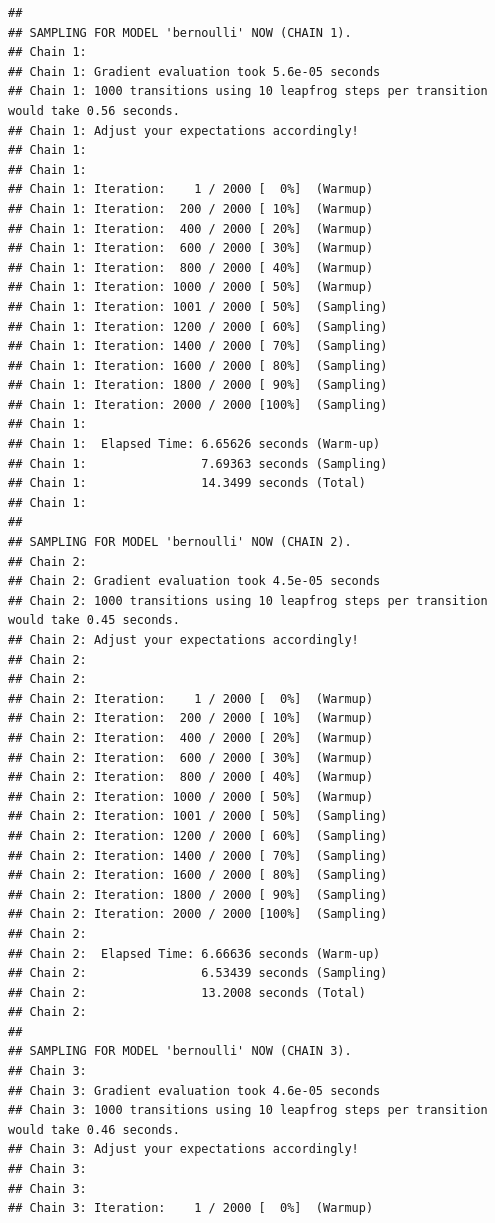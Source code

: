\documentclass[
]{article}
\begin{document}
\begin{verbatim}
## 
## SAMPLING FOR MODEL 'bernoulli' NOW (CHAIN 1).
## Chain 1: 
## Chain 1: Gradient evaluation took 5.6e-05 seconds
## Chain 1: 1000 transitions using 10 leapfrog steps per transition would take 0.56 seconds.
## Chain 1: Adjust your expectations accordingly!
## Chain 1: 
## Chain 1: 
## Chain 1: Iteration:    1 / 2000 [  0%]  (Warmup)
## Chain 1: Iteration:  200 / 2000 [ 10%]  (Warmup)
## Chain 1: Iteration:  400 / 2000 [ 20%]  (Warmup)
## Chain 1: Iteration:  600 / 2000 [ 30%]  (Warmup)
## Chain 1: Iteration:  800 / 2000 [ 40%]  (Warmup)
## Chain 1: Iteration: 1000 / 2000 [ 50%]  (Warmup)
## Chain 1: Iteration: 1001 / 2000 [ 50%]  (Sampling)
## Chain 1: Iteration: 1200 / 2000 [ 60%]  (Sampling)
## Chain 1: Iteration: 1400 / 2000 [ 70%]  (Sampling)
## Chain 1: Iteration: 1600 / 2000 [ 80%]  (Sampling)
## Chain 1: Iteration: 1800 / 2000 [ 90%]  (Sampling)
## Chain 1: Iteration: 2000 / 2000 [100%]  (Sampling)
## Chain 1: 
## Chain 1:  Elapsed Time: 6.65626 seconds (Warm-up)
## Chain 1:                7.69363 seconds (Sampling)
## Chain 1:                14.3499 seconds (Total)
## Chain 1: 
## 
## SAMPLING FOR MODEL 'bernoulli' NOW (CHAIN 2).
## Chain 2: 
## Chain 2: Gradient evaluation took 4.5e-05 seconds
## Chain 2: 1000 transitions using 10 leapfrog steps per transition would take 0.45 seconds.
## Chain 2: Adjust your expectations accordingly!
## Chain 2: 
## Chain 2: 
## Chain 2: Iteration:    1 / 2000 [  0%]  (Warmup)
## Chain 2: Iteration:  200 / 2000 [ 10%]  (Warmup)
## Chain 2: Iteration:  400 / 2000 [ 20%]  (Warmup)
## Chain 2: Iteration:  600 / 2000 [ 30%]  (Warmup)
## Chain 2: Iteration:  800 / 2000 [ 40%]  (Warmup)
## Chain 2: Iteration: 1000 / 2000 [ 50%]  (Warmup)
## Chain 2: Iteration: 1001 / 2000 [ 50%]  (Sampling)
## Chain 2: Iteration: 1200 / 2000 [ 60%]  (Sampling)
## Chain 2: Iteration: 1400 / 2000 [ 70%]  (Sampling)
## Chain 2: Iteration: 1600 / 2000 [ 80%]  (Sampling)
## Chain 2: Iteration: 1800 / 2000 [ 90%]  (Sampling)
## Chain 2: Iteration: 2000 / 2000 [100%]  (Sampling)
## Chain 2: 
## Chain 2:  Elapsed Time: 6.66636 seconds (Warm-up)
## Chain 2:                6.53439 seconds (Sampling)
## Chain 2:                13.2008 seconds (Total)
## Chain 2: 
## 
## SAMPLING FOR MODEL 'bernoulli' NOW (CHAIN 3).
## Chain 3: 
## Chain 3: Gradient evaluation took 4.6e-05 seconds
## Chain 3: 1000 transitions using 10 leapfrog steps per transition would take 0.46 seconds.
## Chain 3: Adjust your expectations accordingly!
## Chain 3: 
## Chain 3: 
## Chain 3: Iteration:    1 / 2000 [  0%]  (Warmup)

\end{verbatim}
\end{document}

